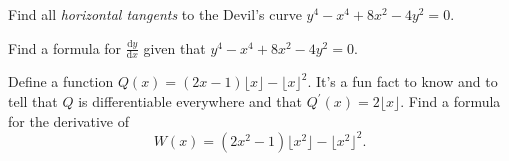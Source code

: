 \documentclass[12pt,fleqn,answers]{exam}
\begin{document}
\begin{questions}

 \question Find all \emph{horizontal tangents} to the Devil's curve 
$y^4 - x^4 + 8 x^2 - 4 y^2 = 0$. 

\question Find a formula for $\displaystyle \frac{\mathrm{d} y}{\mathrm{d} x}$
given that $y^4 - x^4 + 8 x^2 - 4 y^2 = 0$.


\question 
Define a function $Q(x) = (2 x - 1 ) \lfloor x \rfloor - \lfloor x \rfloor^2$.
It's a fun fact to know and to tell that $Q$ is differentiable everywhere and that
$Q^\prime(x) = 2 \lfloor x \rfloor$.  Find a formula for
the derivative of 
\begin{equation*}
    W(x) =  (2 x^2 - 1 ) \lfloor x^2 \rfloor - \lfloor x^2 \rfloor^2.
\end{equation*}

\end{questions}
\end{document}
